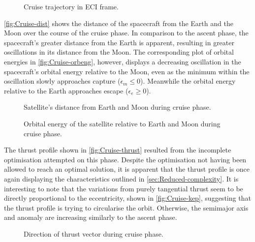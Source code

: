 \begin{figure}
\centering
\def\svgwidth{\figurewidth}

\caption{Cruise trajectory in ECI frame.}
\label{fig:Cruise-3D}
\end{figure}

\autoref{fig:Cruise-dist} shows the distance of the spacecraft from the Earth and the Moon over the course of the cruise phase. In comparison to the ascent phase, the spacecraft's greater distance from the Earth is apparent, resulting in greater oscillations in its distance from the Moon. The corresponding plot of orbital energies in \autoref{fig:Cruise-orbeng}, however, displays a decreasing oscillation in the spacecraft's orbital energy relative to the Moon, even as the minimum within the oscillation slowly approaches capture ($\epsilon_m\le0$). Meanwhile the orbital energy relative to the Earth approaches escape ($\epsilon_e\ge0$). 

\begin{figure}
\centering
\def\svgwidth{\figurewidth}

\caption{Satellite's distance from Earth and Moon during cruise phase.}
\label{fig:Cruise-dist}
\end{figure}

\begin{figure}
\centering
\def\svgwidth{\figurewidth}

\caption{Orbital energy of the satellite relative to Earth and Moon during cruise phase.}
\label{fig:Cruise-orbeng}
\end{figure}

The thrust profile shown in \autoref{fig:Cruise-thrust} resulted from the incomplete optimisation attempted on this phase. Despite the optimisation not having been allowed to reach an optimal solution, it is apparent that the thrust profile is once again displaying the characteristics outlined in \autoref{sec:Reduced-complexity}. It is interesting to note that the variations from purely tangential thrust seem to be directly proportional to the eccentricity, shown in \autoref{fig:Cruise-kep}, suggesting that the thrust profile is trying to circularise the orbit. Otherwise, the semimajor axis and anomaly are increasing similarly to the ascent phase.

\begin{figure}
\centering
\def\svgwidth{\figurewidth}

\caption{Direction of thrust vector during cruise phase.}
\label{fig:Cruise-thrust}
\end{figure}


